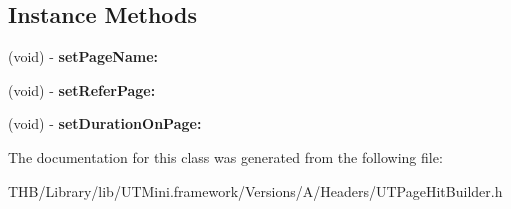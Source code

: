 \subsection*{Instance Methods}
\begin{DoxyCompactItemize}
\item 
\mbox{\label{interface_u_t_page_hit_builder_aa46acc9d3ec579633441c95906b7e246}} 
(void) -\/ {\bfseries set\+Page\+Name\+:}
\item 
\mbox{\label{interface_u_t_page_hit_builder_a2db6ab96df68ce1e8666fd5842d2e780}} 
(void) -\/ {\bfseries set\+Refer\+Page\+:}
\item 
\mbox{\label{interface_u_t_page_hit_builder_abef94bcbdce91dc59c72e15e2c2a3695}} 
(void) -\/ {\bfseries set\+Duration\+On\+Page\+:}
\end{DoxyCompactItemize}


The documentation for this class was generated from the following file\+:\begin{DoxyCompactItemize}
\item 
T\+H\+B/\+Library/lib/\+U\+T\+Mini.\+framework/\+Versions/\+A/\+Headers/U\+T\+Page\+Hit\+Builder.\+h\end{DoxyCompactItemize}
